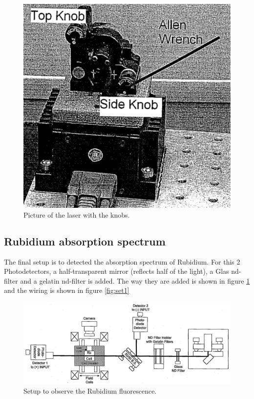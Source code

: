 \begin{figure}[H]
	\centering
	\includegraphics[width=\textwidth]{laser.png}
	\caption{Picture of the laser with the knobs. \cite{V60}}
	\end{figure}

\subsection{Rubidium absorption spectrum}
The final setup is to detected the absorption spectrum of Rubidium. For this 2 Photodetectors, a half-transparent
mirror (reflects half of the light), a Glas nd-filter and a gelatin nd-filter is added. The way they are added is 
shown in figure \ref{fig:sub} and the wiring is shown in figure \ref{fig:set1}

\begin{figure}[H]
	\centering
	\includegraphics[width=\textwidth]{setup_substraction.png}
	\caption{Setup to observe the Rubidium fluorescence. \cite{V60}}
	\label{fig:sub}
\end{figure}

